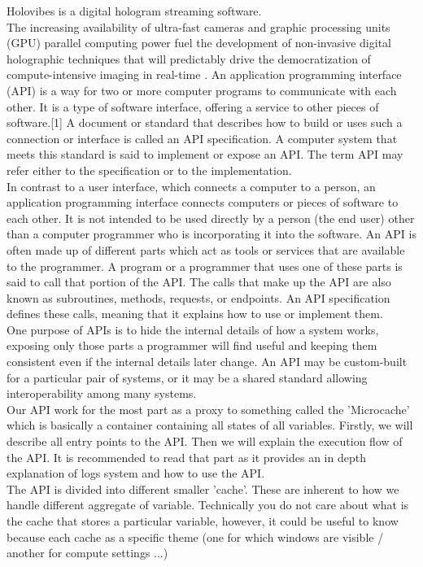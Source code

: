 \documentclass[
 reprint,
 superscriptaddress,
 amsmath,
 amssymb,
 aps,
]{revtex4-2}
\begin{document}
Holovibes is a digital hologram streaming software.\\
The increasing availability of ultra-fast cameras and graphic processing units (GPU) parallel computing power fuel the development of non-invasive digital holographic techniques that will predictably drive the democratization of compute-intensive imaging in real-time \cite{Leutenegger2011Real, samson2011video, Bencteux2015Holographic, Puyo2020Realtime}.
An application programming interface (API) is a way for two or more computer programs to communicate with each other. It is a type of software interface, offering a service to other pieces of software.[1] A document or standard that describes how to build or uses such a connection or interface is called an API specification. A computer system that meets this standard is said to implement or expose an API. The term API may refer either to the specification or to the implementation.\\
In contrast to a user interface, which connects a computer to a person, an application programming interface connects computers or pieces of software to each other. It is not intended to be used directly by a person (the end user) other than a computer programmer who is incorporating it into the software. An API is often made up of different parts which act as tools or services that are available to the programmer. A program or a programmer that uses one of these parts is said to call that portion of the API. The calls that make up the API are also known as subroutines, methods, requests, or endpoints. An API specification defines these calls, meaning that it explains how to use or implement them.\\
One purpose of APIs is to hide the internal details of how a system works, exposing only those parts a programmer will find useful and keeping them consistent even if the internal details later change. An API may be custom-built for a particular pair of systems, or it may be a shared standard allowing interoperability among many systems.\\
Our API work for the most part as a proxy to something called the 'Microcache' which is basically a container containing all states of all variables. Firstly, we will describe all entry points to the API. Then we will explain the execution flow of the API. It is recommended to read that part as it provides an in depth explanation of logs system and how to use the API.\\
The API is divided into different smaller 'cache'. These are inherent to how we handle different aggregate of variable. Technically you do not care about what is the cache that stores a particular variable, however, it could be useful to know because each cache as a specific theme (one for which windows are visible / another for compute settings ...) 
\end{document}
